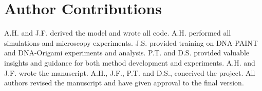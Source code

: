 \section{Author Contributions}
A.H. and J.F. derived the model and wrote all code.
%
A.H. performed all simulations and microscopy experiments. 
%
J.S. provided training on DNA-PAINT and DNA-Origami experiments and analysis.
%
P.T. and D.S. provided valuable insights and guidance for both method development and experiments.
%
A.H. and J.F. wrote the manuscript.
%
A.H., J.F., P.T. and D.S., conceived the project.
%
All authors revised the manuscript and have given approval to the final version.